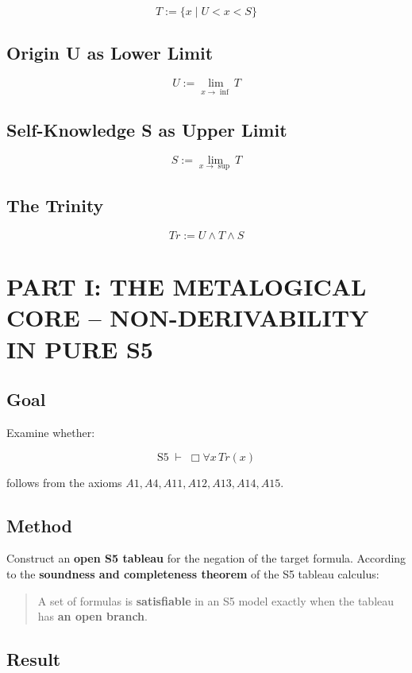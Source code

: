 \documentclass[
]{article}
\begin{document}
\[
\boxed{T := \{ x \mid U < x < S \}}
\]

\subsection{Origin U as Lower Limit}

\[
\boxed{U := \lim_{x \to \inf} T}
\]

\subsection{Self-Knowledge S as Upper Limit}

\[
\boxed{S := \lim_{x \to \sup} T}
\]

\subsection{The Trinity}

\[
\boxed{Tr := U \land T \land S}
\]

\section{PART I: THE METALOGICAL CORE – NON-DERIVABILITY IN PURE S5}

\subsection{Goal}

Examine whether:

\[
\boxed{\text{S5} \;\vdash\; \Box\forall x\,Tr(x)}
\]

follows from the axioms \(A1, A4, A11, A12, A13, A14, A15\).

\subsection{Method}

Construct an \textbf{open S5 tableau} for the negation of the target formula.  
According to the \textbf{soundness and completeness theorem} of the S5 tableau calculus:

\begin{quote}
A set of formulas is \textbf{satisfiable} in an S5 model exactly when the tableau has \textbf{an open branch}.
\end{quote}

\subsection{Result}
\end{document}
